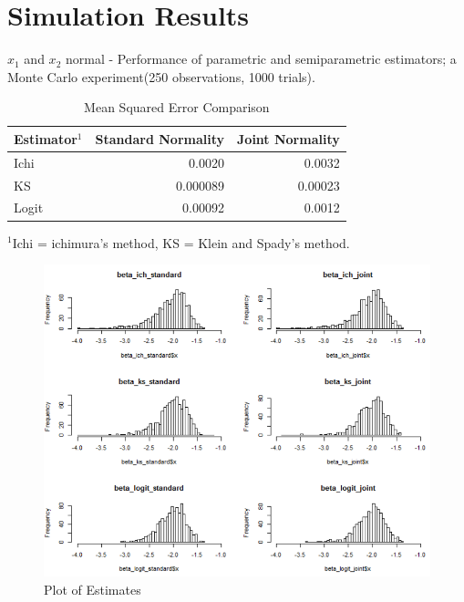 \documentclass[a4paper]{article}
\begin{document}
\section{Simulation Results}

\begin{table}[H]
\caption {Mean Squared Error Comparison} \label{tab:mean squared error}

$x_1$ and $x_2$ normal - Performance of parametric and semiparametric estimators; a Monte Carlo experiment(250 observations, 1000 trials).
\centering
\begin{tabular}{l r r}

\toprule
Estimator$^1$ & \textbf{Standard Normality} & \textbf{Joint Normality} \tabularnewline\midrule
Ichi & 0.0020 & 0.0032
\tabularnewline
KS & 0.000089 & 0.00023
\tabularnewline 
Logit & 0.00092  & 0.0012
\tabularnewline
\bottomrule
\end{tabular}

$^1$Ichi = ichimura's method, KS = Klein and Spady's method.
\end{table}

\begin{figure}[h!]
  \caption{Plot of Estimates}
  \includegraphics[width=\linewidth]{plot_comparison.png}
 
  \label{fig:plot of estimates}
\end{figure}
\end{document}
